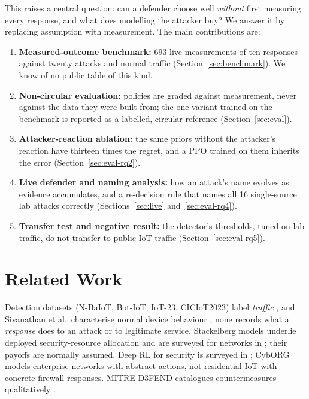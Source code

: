 \documentclass[conference]{IEEEtran}
\begin{document}
This raises a central question: can a defender choose well \emph{without} first measuring every response, and what does modelling the attacker buy? We answer it by replacing assumption with measurement. The main contributions are:
\begin{enumerate}
\item \textbf{Measured-outcome benchmark:} 693 live measurements of ten responses against twenty attacks and normal traffic (Section~\ref{sec:benchmark}). We know of no public table of this kind.
\item \textbf{Non-circular evaluation:} policies are graded against measurement, never against the data they were built from; the one variant trained on the benchmark is reported as a labelled, circular reference (Section~\ref{sec:eval}).
\item \textbf{Attacker-reaction ablation:} the same priors without the attacker's reaction have thirteen times the regret, and a PPO trained on them inherits the error (Section~\ref{sec:eval-rq2}).
\item \textbf{Live defender and naming analysis:} how an attack's name evolves as evidence accumulates, and a re-decision rule that names all 16 single-source lab attacks correctly (Sections~\ref{sec:live} and~\ref{sec:eval-rq4}).
\item \textbf{Transfer test and negative result:} the detector's thresholds, tuned on lab traffic, do not transfer to public IoT traffic (Section~\ref{sec:eval-rq5}).
\end{enumerate}

\section{Related Work}
\label{sec:related}
Detection datasets (N-BaIoT, Bot-IoT, IoT-23, CICIoT2023) label \emph{traffic} \cite{meidan2018nbaiot,koroniotis2019botiot,garcia2020iot23,neto2023ciciot}, and Sivanathan et al.\ characterise normal device behaviour \cite{sivanathan2019classifying}; none records what a \emph{response} does to an attack or to legitimate service. Stackelberg models underlie deployed security-resource allocation \cite{tambe2011security} and are surveyed for networks in \cite{manshaei2013game,alpcan2010network}; their payoffs are normally assumed. Deep RL for security is surveyed in \cite{nguyen2021deep}; CybORG \cite{standen2021cyborg} models enterprise networks with abstract actions, not residential IoT with concrete firewall responses. MITRE D3FEND catalogues countermeasures qualitatively \cite{kaloroumakis2021d3fend}.
\end{document}
